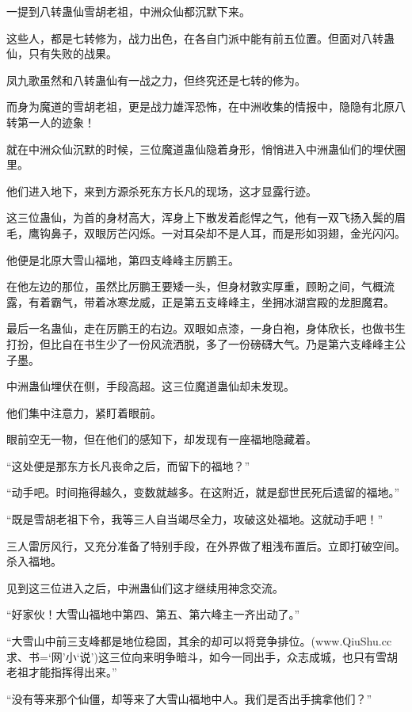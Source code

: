 
\begin{this_body}

一提到八转蛊仙雪胡老祖，中洲众仙都沉默下来。

这些人，都是七转修为，战力出色，在各自门派中能有前五位置。但面对八转蛊仙，只有失败的战果。

凤九歌虽然和八转蛊仙有一战之力，但终究还是七转的修为。

而身为魔道的雪胡老祖，更是战力雄浑恐怖，在中洲收集的情报中，隐隐有北原八转第一人的迹象！

就在中洲众仙沉默的时候，三位魔道蛊仙隐着身形，悄悄进入中洲蛊仙们的埋伏圈里。

他们进入地下，来到方源杀死东方长凡的现场，这才显露行迹。

这三位蛊仙，为首的身材高大，浑身上下散发着彪悍之气，他有一双飞扬入鬓的眉毛，鹰钩鼻子，双眼厉芒闪烁。一对耳朵却不是人耳，而是形如羽翅，金光闪闪。

他便是北原大雪山福地，第四支峰峰主厉鹏王。

在他左边的那位，虽然比厉鹏王要矮一头，但身材敦实厚重，顾盼之间，气概流露，有着霸气，带着冰寒龙威，正是第五支峰峰主，坐拥冰湖宫殿的龙胆魔君。

最后一名蛊仙，走在厉鹏王的右边。双眼如点漆，一身白袍，身体欣长，也做书生打扮，但比自在书生少了一份风流洒脱，多了一份磅礴大气。乃是第六支峰峰主公子墨。

中洲蛊仙埋伏在侧，手段高超。这三位魔道蛊仙却未发现。

他们集中注意力，紧盯着眼前。

眼前空无一物，但在他们的感知下，却发现有一座福地隐藏着。

“这处便是那东方长凡丧命之后，而留下的福地？”

“动手吧。时间拖得越久，变数就越多。在这附近，就是郄世民死后遗留的福地。”

“既是雪胡老祖下令，我等三人自当竭尽全力，攻破这处福地。这就动手吧！”

三人雷厉风行，又充分准备了特别手段，在外界做了粗浅布置后。立即打破空间。杀入福地。

见到这三位进入之后，中洲蛊仙们这才继续用神念交流。

“好家伙！大雪山福地中第四、第五、第六峰主一齐出动了。”

“大雪山中前三支峰都是地位稳固，其余的却可以将竞争排位。(www.QiuShu.cc 求、书=‘网’小‘说’)这三位向来明争暗斗，如今一同出手，众志成城，也只有雪胡老祖才能指挥得出来。”

“没有等来那个仙僵，却等来了大雪山福地中人。我们是否出手擒拿他们？”


\end{this_body}
